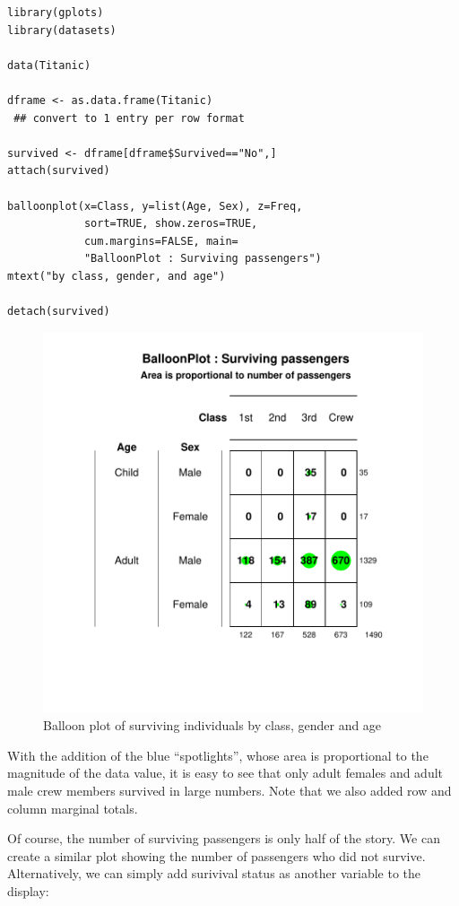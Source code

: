\documentclass[a4paper]{report}
\begin{document}
\begin{article}
{\small
\begin{verbatim}
library(gplots)
library(datasets)

data(Titanic)

dframe <- as.data.frame(Titanic)
 ## convert to 1 entry per row format

survived <- dframe[dframe$Survived=="No",]
attach(survived)

balloonplot(x=Class, y=list(Age, Sex), z=Freq,
            sort=TRUE, show.zeros=TRUE,
            cum.margins=FALSE, main=
            "BalloonPlot : Surviving passengers")
mtext("by class, gender, and age")

detach(survived)
\end{verbatim}
}

\begin{figure}
\includegraphics[width=\textwidth]{Figure2.pdf}
\caption{\label{figure:Figure2}
Balloon plot of surviving individuals by class, gender and age }
\end{figure}

With the addition of the blue ``spotlights'', whose area is
proportional to the magnitude of the data value, it is easy to see
that only adult females and adult male crew members survived in
large numbers.  Note that we also added row and column marginal
totals.

Of course, the number of surviving passengers is only half of the
story.  We can create a similar plot showing the number of
passengers who did not survive.  Alternatively, we can simply add
surivival status as another variable to the display:


\end{article}
\end{document}
